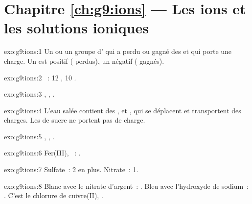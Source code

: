 \section*{Chapitre \ref{ch:g9:ions} --- Les ions et les solutions ioniques}

\begin{solution}{exo:g9:ions:1}
Un  ou un groupe d' qui a perdu ou gagné des  et qui
porte une charge. Un  est positif ( perdus), un 
négatif ( gagnés).
\end{solution}

\begin{solution}{exo:g9:ions:2}
~: 12 , 10 .
\end{solution}

\begin{solution}{exo:g9:ions:3}
, , .
\end{solution}

\begin{solution}{exo:g9:ions:4}
L'eau salée contient des ,  et , qui se
déplacent et transportent des charges. Les  de sucre ne portent
pas de charge.
\end{solution}

\begin{solution}{exo:g9:ions:5}
, , .
\end{solution}

\begin{solution}{exo:g9:ions:6}
Fer(III), ~: .
\end{solution}

\begin{solution}{exo:g9:ions:7}
Sulfate~: 2  en plus. Nitrate~: 1.
\end{solution}

\begin{solution}{exo:g9:ions:8}
Blanc avec le nitrate d'argent~: . Bleu avec l'hydroxyde de
sodium~: . C'est le chlorure de cuivre(II), .
\end{solution}

